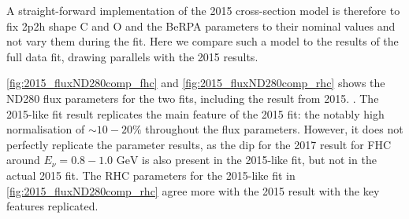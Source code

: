 A straight-forward implementation of the 2015 cross-section model is therefore to fix 2p2h shape C and O and the BeRPA parameters to their nominal values and not vary them during the fit. Here we compare such a model to the results of the full data fit, drawing parallels with the 2015 results.

\autoref{fig:2015_fluxND280comp_fhc} and \autoref{fig:2015_fluxND280comp_rhc} shows the ND280 flux parameters for the two fits, including the result from 2015. . The 2015-like fit result replicates the main feature of the 2015 fit: the notably high normalisation of $\sim10-20\%$ throughout the flux parameters. However, it does not perfectly replicate the parameter results, as the dip for the 2017 result for FHC \numu around $E_\nu = 0.8-1.0\text{ GeV}$ is also present in the 2015-like fit, but not in the actual 2015 fit. The RHC parameters for the 2015-like fit in \autoref{fig:2015_fluxND280comp_rhc} agree more with the 2015 result with the key features replicated.

